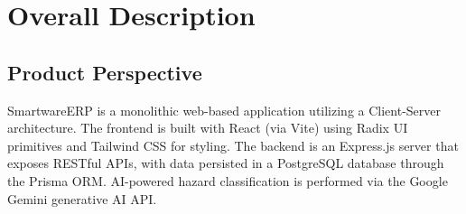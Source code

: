 \documentclass[12pt,a4paper]{report}
\begin{document}
\chapter{Overall Description}

\section{Product Perspective}
SmartwareERP is a monolithic web-based application utilizing a Client-Server architecture. The frontend is built with React (via Vite) using Radix UI primitives and Tailwind CSS for styling. The backend is an Express.js server that exposes RESTful APIs, with data persisted in a PostgreSQL database through the Prisma ORM. AI-powered hazard classification is performed via the Google Gemini generative AI API.
\end{document}
